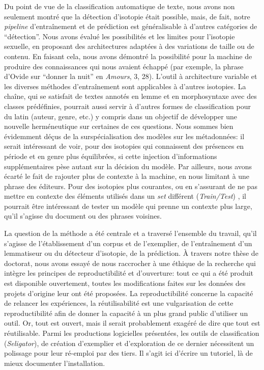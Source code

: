 Du point de vue de la classification automatique de texte, nous avons non seulement montré que la détection d'isotopie était possible, mais, de fait, notre \textit{pipeline} d'entraînement et de prédiction est généralisable à d'autres catégories de \enquote{détection}. Nous avons évalué les possibilités et les limites pour l'isotopie sexuelle, en proposant des architectures adaptées à des variations de taille ou de contenu. En faisant cela, nous avons démontré la possibilité pour la machine de produire des connaissances qui nous avaient échappé (par exemple, la phrase d'Ovide sur \enquote{donner la nuit} en \textit{Amours}, 3, 28). L'outil à architecture variable et les diverses méthodes d'entraînement sont applicables à d'autres isotopies. La chaîne, qui se satisfait de textes annotés en lemme et en morphosyntaxe avec des classes prédéfinies, pourrait aussi servir à d'autres formes de classification pour du latin (auteur, genre, etc.) y compris dans un objectif de développer une nouvelle herméneutique sur certaines de ces questions. Nous sommes bien évidemment déçus de la surspécialisation des modèles sur les métadonnées: il serait intéressant de voir, pour des isotopies qui connaissent des présences en période et en genre plus équilibrées, si cette injection d'informations supplémentaires pèse autant sur la décision du modèle. Par ailleurs, nous avons écarté le fait de rajouter plus de contexte à la machine, en nous limitant à une phrase des éditeurs. Pour des isotopies plus courantes, ou en s'assurant de ne pas mettre en contexte des éléments utilisés dans un \textit{set} différent (\textit{Train/Test}) , il pourrait être intéressant de tester un modèle qui prenne un contexte plus large, qu'il s'agisse du document ou des phrases voisines.

La question de la méthode a été centrale et a traversé l'ensemble du travail, qu'il s'agisse de l'établissement d'un corpus et de l'exemplier, de l'entraînement d'un lemmatiseur ou du détecteur d'isotopie, de la prédiction. À travers notre thèse de doctorat, nous avons essayé de nous raccrocher à une éthique de la recherche qui intègre les principes de reproductibilité et d'ouverture: tout ce qui a été produit est disponible ouvertement, toutes les modifications faites sur les données des projets d'origine leur ont été proposées. La reproductibilité concerne la capacité de relancer les expériences, la réutilisabilité est une vulgarisation de cette reproductibilité afin de donner la capacité à un plus grand public d'utiliser un outil. Or, tout est ouvert, mais il serait probablement exagéré de dire que tout est réutilisable. Parmi les productions logicielles présentées, les outils de classification (\textit{Seligator}), de création d'exemplier et d'exploration de ce dernier nécessitent un polissage pour leur ré-emploi par des tiers. Il s'agit ici d'écrire un tutoriel, là de mieux documenter l'installation. 

